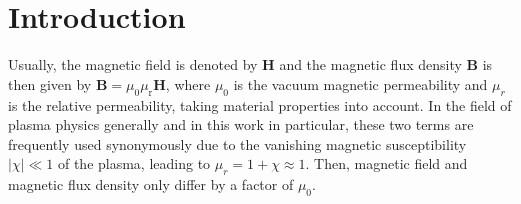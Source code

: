 \section{Introduction}
\label{sec:introduction}

Usually,
the magnetic field is denoted by $\mathbf{H}$ and
the magnetic flux density $\mathbf{B}$ is then given by $\mathbf{B} = \mu_0 \mu_\mathrm{r} \mathbf{H}$,
where $\mu_0$ is the vacuum magnetic permeability
and $\mu_r$ is the relative permeability, taking material properties into account.
In the field of plasma physics generally and in this work in particular,
these two terms are frequently used synonymously
due to the vanishing magnetic susceptibility $|\chi| \ll 1$ of the plasma,
leading to $\mu_r = 1+\chi \approx 1$.
Then, magnetic field and magnetic flux density only differ by a factor of $\mu_0$.

